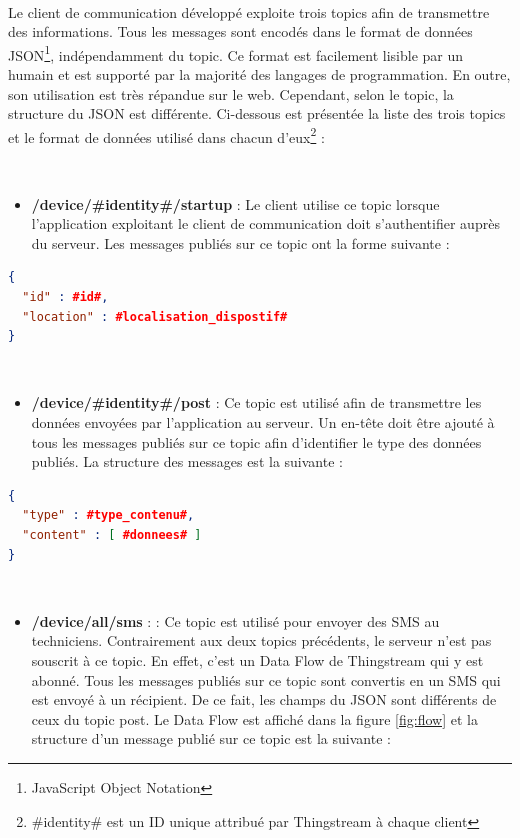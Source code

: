 ~

\noindent
Le client de communication développé exploite trois topics afin de transmettre des informations. Tous les messages sont encodés dans le format de données JSON\footnote{JavaScript Object Notation}, indépendamment du topic. Ce format est facilement lisible par un humain et est supporté par la majorité des langages de programmation. En outre, son utilisation est très répandue sur le web. Cependant, selon le topic, la structure du JSON est différente. Ci-dessous est présentée la liste des trois topics et le format de données utilisé dans chacun d'eux\footnote{\#identity\# est un ID unique attribué par Thingstream à chaque client} :

~

\begin{itemize}
  \item \textbf{/device/\#identity\#/startup} : Le client utilise ce topic lorsque l'application exploitant le client de communication doit s'authentifier auprès du serveur. Les messages publiés sur ce topic ont la forme suivante :
\end{itemize}

\begin{lstlisting}[language=json]
{
  "id" : #id#,
  "location" : #localisation_dispostif#
}
\end{lstlisting}

~

\begin{itemize}
  \item \textbf{/device/\#identity\#/post} : Ce topic est utilisé afin de transmettre les données envoyées par l'application au serveur. Un en-tête doit être ajouté à tous les messages publiés sur ce topic afin d'identifier le type des données publiés. La structure des messages est la suivante :
\end{itemize}

\begin{lstlisting}[language=json]
{
  "type" : #type_contenu#,
  "content" : [ #donnees# ]
}
\end{lstlisting}

~

\begin{itemize}
  \item \textbf{/device/all/sms} : : Ce topic est utilisé pour envoyer des SMS au techniciens. Contrairement aux deux topics précédents, le serveur n'est pas souscrit à ce topic. En effet, c'est un Data Flow de Thingstream qui y est abonné. Tous les messages publiés sur ce topic sont convertis en un SMS qui est envoyé à un récipient. De ce fait, les champs du JSON sont différents de ceux du topic post. Le Data Flow est affiché dans la figure \ref{fig:flow} et la structure d'un message publié sur ce topic est la suivante :
\end{itemize}

